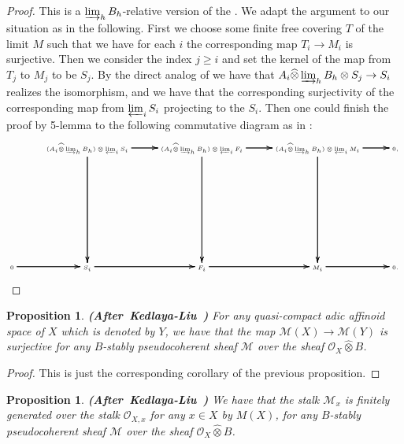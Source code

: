\documentclass[12pt]{amsart}
\newtheorem{proposition}[theorem]{Proposition}
\theoremstyle{definition}
\numberwithin{equation}{section}
\begin{document}
\begin{proof}
This is a $\varinjlim_h B_h$-relative version of the \cite[Lemma 2.6.4]{KL2}. We adapt the argument to our situation as in the following. First we choose some finite free covering $T$ of the limit $M$ such that we have for each $i$ the corresponding map $T_i\rightarrow M_i$ is surjective. Then we consider the index $j\geq i$ and set the kernel of the map from $T_j$ to $M_j$ to be $S_j$. By the direct analog of \cite[Lemma 2.5.6]{KL2} we have that $A_i\widehat{\otimes}\varinjlim_h B_h\otimes S_j\overset{}{\rightarrow}S_i$ realizes the isomorphism, and we have that the corresponding surjectivity of the corresponding map from $\varprojlim_i S_i$ projecting to the $S_i$. Then one could finish the proof by 5-lemma to the following commutative diagram as in \cite[Lemma 2.6.4]{KL2}:
\[ \tiny
\xymatrix@C+0pc@R+6pc{
 &(A_i\widehat{\otimes}\varinjlim_h B_h)\otimes \varprojlim_i S_i \ar[r]\ar[r]\ar[r] \ar[d]\ar[d]\ar[d] &(A_i\widehat{\otimes}\varinjlim_h B_h)\otimes \varprojlim_i F_i \ar[r]\ar[r]\ar[r] \ar[d]\ar[d]\ar[d] &(A_i\widehat{\otimes}\varinjlim_h B_h)\otimes \varprojlim_i M_i\ar[r]\ar[r]\ar[r]  \ar[d]\ar[d]\ar[d]&0,\\
0 \ar[r]\ar[r]\ar[r] &S_i   \ar[r]\ar[r]\ar[r] &F_i \ar[r]\ar[r]\ar[r] &M_i \ar[r]\ar[r]\ar[r] &0.\\
}
\]
 
\end{proof}



\begin{proposition}  \mbox{\bf{(After Kedlaya-Liu \cite[Theorem 2.6.5]{KL2})}}
For any quasi-compact adic affinoid space of $X$ which is denoted by $Y$, we have that the map $\mathcal{M}(X)\rightarrow \mathcal{M}(Y)$ is surjective for any $B$-stably pseudocoherent sheaf $\mathcal{M}$ over the sheaf $\mathcal{O}_X\widehat{\otimes}B$.	
\end{proposition}


\begin{proof}
This is just the corresponding corollary of the previous proposition.	
\end{proof}



\begin{proposition}  \mbox{\bf{(After Kedlaya-Liu \cite[Theorem 2.6.5]{KL2})}}
We have that the stalk $\mathcal{M}_x$ is finitely generated over the stalk $\mathcal{O}_{X,x}$ for any $x\in X$ by $M(X)$, for any $B$-stably pseudocoherent sheaf $\mathcal{M}$ over the sheaf $\mathcal{O}_X\widehat{\otimes}B$.	
\end{proposition}
\end{document}
